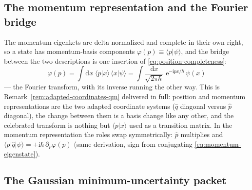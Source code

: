 \documentclass[11pt]{article}
\theoremstyle{plain}
\theoremstyle{definition}
\theoremstyle{remark}
\newcommand{\dd}{\mathrm{d}}
\newcommand{\ee}{\mathrm{e}}
\newcommand{\ii}{\mathrm{i}}
\newcommand{\op}[1]{\hat{#1}}
\newcommand{\ket}[1]{\lvert #1 \rangle}
\newcommand{\bra}[1]{\langle #1 \rvert}
\newcommand{\braket}[2]{\langle #1 | #2 \rangle}
\begin{document}
\subsection{The momentum representation and the Fourier bridge}
\label{sec:momentum-rep}

The momentum eigenkets are delta-normalized and complete in their
own right, so a state has momentum-basis components
$\varphi(p) \equiv \braket p\psi$, and the bridge between the two
descriptions is one insertion of
\eqref{eq:position-completeness}:
\begin{equation}
  \varphi(p)
  = \int\dd x\;\braket px\,\braket x\psi
  = \int\frac{\dd x}{\sqrt{2\pi\hbar}}\;
    \ee^{-\ii p x/\hbar}\,\psi(x)
  \label{eq:fourier-bridge}
\end{equation}
--- the Fourier transform, with its inverse running the other way.
This is Remark~\ref{rem:adapted-coordinates-qm} delivered in
full: position and momentum representations are the two adapted
coordinate systems ($\op q$ diagonal versus $\op p$ diagonal), the
change between them is a basis change like any other, and the
celebrated transform is nothing but
$\braket px$ used as a transition matrix. In the momentum
representation the roles swap symmetrically: $\op p$ multiplies and
$\bra p\op q\ket\psi = +\ii\hbar\,\partial_p\varphi(p)$ (same
derivation, sign from conjugating \eqref{eq:momentum-eigenstate}).

\subsection{The Gaussian minimum-uncertainty packet}
\label{sec:gaussian-packet}
\end{document}
